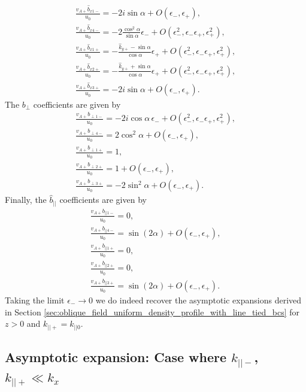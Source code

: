 \begin{gather}
    \frac{v_{A+}\hat{b}_{x1-}}{u_0} = -2i\sin\alpha + O(\epsilon_-,\epsilon_+), \\
    \frac{v_{A+}\hat{b}_{x4-}}{u_0} = -2\frac{\cos^2\alpha}{\sin\alpha}\epsilon_- + O(\epsilon_-^2,\epsilon_-\epsilon_+,\epsilon_+^2), \\
    \frac{v_{A+}\hat{b}_{x1+}}{u_0} = -\frac{\hat{k}_{y+} - \sin\alpha}{\cos\alpha}\epsilon_+ + O(\epsilon_-^2,\epsilon_-\epsilon_+,\epsilon_+^2), \\
    \frac{v_{A+}\hat{b}_{x2+}}{u_0} = -\frac{\hat{k}_{y+}+\sin\alpha}{\cos\alpha}\epsilon_+ + O(\epsilon_-^2,\epsilon_-\epsilon_+,\epsilon_+^2), \\
    \frac{v_{A+}\hat{b}_{x3+}}{u_0} = -2i\sin\alpha+O(\epsilon_-,\epsilon_+).
\end{gather}
The $b_\perp$ coefficients are given by
\begin{gather}
    \frac{v_{A+}b_{\perp1-}}{u_0} = -2i\cos\alpha\,\epsilon_- + O(\epsilon_-^2,\epsilon_-\epsilon_+,\epsilon_+^2), \\
    \frac{v_{A+}b_{\perp4-}}{u_0} = 2\cos^2\alpha + O(\epsilon_-,\epsilon_+), \\
    \frac{v_{A+}b_{\perp1+}}{u_0} = 1, \\
    \frac{v_{A+}b_{\perp2+}}{u_0} = 1 + O(\epsilon_-,\epsilon_+), \\
    \frac{v_{A+}b_{\perp3+}}{u_0} = -2\sin^2\alpha + O(\epsilon_-, \epsilon_+).
\end{gather}
Finally,  the $\hat{b}_{||}$ coefficients are given by
\begin{gather}
    \frac{v_{A+}b_{||1-}}{u_0} = 0, \\
    \frac{v_{A+}b_{||4-}}{u_0} = \sin(2\alpha) + O(\epsilon_-,\epsilon_+), \\
    \frac{v_{A+}b_{||1+}}{u_0} = 0, \\
    \frac{v_{A+}b_{||2+}}{u_0} = 0, \\
    \frac{v_{A+}b_{||3+}}{u_0} = \sin(2\alpha) + O(\epsilon_-, \epsilon_+).
\end{gather}
Taking the limit $\epsilon_-\rightarrow0$ we do indeed recover the asymptotic expansions derived in Section \ref{sec:oblique_field_uniform_density_profile_with_line_tied_bcs} for $z>0$ and $k_{||+}=k_{||0}$.

\subsection{Asymptotic expansion: Case where \texorpdfstring{$k_{||-}$, $k_{||+} \ll k_x$}{k||-, k||+ << kx}}

